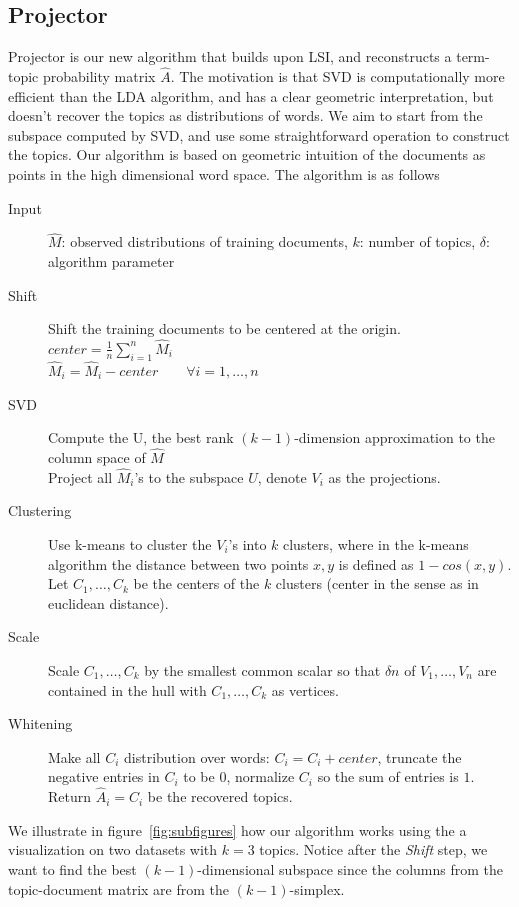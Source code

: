 \subsection{Projector}
Projector is our new algorithm that builds upon LSI, and reconstructs
a term-topic probability matrix $\hat{A}$. The motivation is that SVD
is computationally more efficient than the LDA algorithm, and has a
clear geometric interpretation, but doesn't recover the topics as
distributions of words. We aim to start from the subspace computed by
SVD, and use some straightforward operation to construct the
topics. Our algorithm is based on geometric intuition of the documents
as points in the high dimensional word space. The algorithm is as
follows
\begin{description}
	\item[Input] $\hat{M}$: observed distributions of training documents, $k$: number of topics, $\delta$: algorithm parameter
	\item[Shift] Shift the training documents to be centered at the origin.\\
			     $center=\frac{1}{n}\sum_{i=1}^n\hat{M}_i$\\
			     $\hat{M}_i=\hat{M}_i-center\qquad \forall i=1,\ldots,n$
	\item[SVD] Compute the U, the best rank $(k-1)$-dimension approximation to the column space of $\hat{M}$\\
                                 Project all $\hat{M}_i$'s to the subspace $U$, denote $V_i$ as the projections.
	\item[Clustering] Use k-means to cluster the $V_i$'s into $k$ clusters, where in the k-means algorithm the distance between two points $x,y$ is defined as $1-cos(x,y)$.\\
				      Let $C_1,\ldots,C_k$ be the centers of the $k$ clusters (center in the sense as in euclidean distance).
	\item[Scale] Scale $C_1,\ldots,C_k$ by the smallest common scalar so that $\delta n$ of $V_1,\ldots,V_n$ are contained in the hull with $C_1,\ldots,C_k$ as vertices. 
	\item[Whitening] Make all $C_i$ distribution over words: $C_i=C_i+center$, truncate the negative entries in $C_i$ to be $0$, normalize $C_i$ so the sum of entries is $1$.\\
                                            Return $\hat{A}_i=C_i$ be the recovered topics.
\end{description}
We illustrate in figure~\ref{fig:subfigures} how our algorithm works
using the a visualization on two datasets with $k=3$
topics. Notice after the {\em Shift} step, we want to find the best
$(k-1)$-dimensional subspace since the columns from the topic-document
matrix are from the $(k-1)$-simplex.

